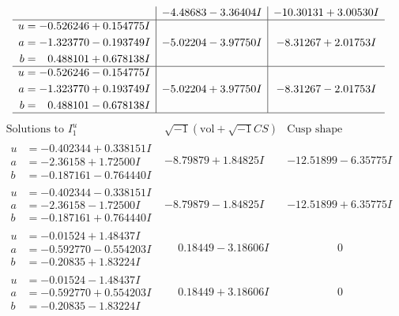 \documentclass[1p]{elsarticle_modified}
\theoremstyle{definition}
\newcommand{\I}{\sqrt{-1}}
\begin{document}
$$\begin{array}{c|c|c}
 & -4.48683 - 3.36404 I & -10.30131 + 3.00530 I \\ \hline\begin{aligned}
u &= -0.526246 + 0.154775 I \\
a &= -1.323770 - 0.193749 I \\
b &= \phantom{-}0.488101 + 0.678138 I\end{aligned}
 & -5.02204 - 3.97750 I & -8.31267 + 2.01753 I \\ \hline\begin{aligned}
u &= -0.526246 - 0.154775 I \\
a &= -1.323770 + 0.193749 I \\
b &= \phantom{-}0.488101 - 0.678138 I\end{aligned}
 & -5.02204 + 3.97750 I & -8.31267 - 2.01753 I\\
 \hline 
 \end{array}$$\newpage$$\begin{array}{c|c|c}  
\text{Solutions to }I^u_{1}& \I (\text{vol} + \sqrt{-1}CS) & \text{Cusp shape}\\
 \hline 
\begin{aligned}
u &= -0.402344 + 0.338151 I \\
a &= -2.36158 + 1.72500 I \\
b &= -0.187161 - 0.764440 I\end{aligned}
 & -8.79879 + 1.84825 I & -12.51899 - 6.35775 I \\ \hline\begin{aligned}
u &= -0.402344 - 0.338151 I \\
a &= -2.36158 - 1.72500 I \\
b &= -0.187161 + 0.764440 I\end{aligned}
 & -8.79879 - 1.84825 I & -12.51899 + 6.35775 I \\ \hline\begin{aligned}
u &= -0.01524 + 1.48437 I \\
a &= -0.592770 - 0.554203 I \\
b &= -0.20835 + 1.83224 I\end{aligned}
 & \phantom{-}0.18449 - 3.18606 I & \phantom{-0.000000 } 0 \\ \hline\begin{aligned}
u &= -0.01524 - 1.48437 I \\
a &= -0.592770 + 0.554203 I \\
b &= -0.20835 - 1.83224 I\end{aligned}
 & \phantom{-}0.18449 + 3.18606 I & \phantom{-0.000000 } 0 \\ \hline\begin{aligned}

\end{aligned}
\end{array}$$
\end{document}
